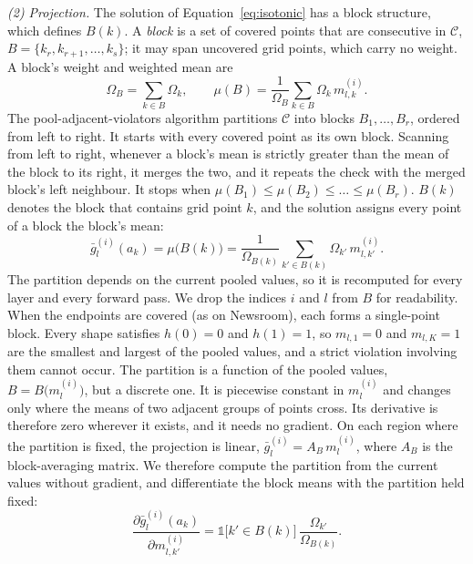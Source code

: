 \documentclass[11pt]{article}
\begin{document}
\emph{(2) Projection.}
The solution of Equation~\ref{eq:isotonic} has a block structure, which defines $B(k)$.
A \emph{block} is a set of covered points that are consecutive in $\mathcal{C}$, $B=\{k_r,k_{r+1},\dots,k_s\}$; it may span uncovered grid points, which carry no weight.
A block's weight and weighted mean are
\begin{equation}
  \Omega_B=\sum_{k\in B}\Omega_k,
  \qquad
  \mu(B)=\frac{1}{\Omega_B}\sum_{k\in B}\Omega_k\, m^{(i)}_{l,k} .
\end{equation}
The pool-adjacent-violators algorithm partitions $\mathcal{C}$ into blocks $B_1,\dots,B_r$, ordered from left to right.
It starts with every covered point as its own block.
Scanning from left to right, whenever a block's mean is strictly greater than the mean of the block to its right, it merges the two, and it repeats the check with the merged block's left neighbour.
It stops when $\mu(B_1)\le\mu(B_2)\le\dots\le\mu(B_r)$.
$B(k)$ denotes the block that contains grid point $k$, and the solution assigns every point of a block the block's mean:
\begin{equation}
  \bar g^{(i)}_l(a_k) = \mu\bigl(B(k)\bigr) = \frac{1}{\Omega_{B(k)}}\sum_{k'\in B(k)} \Omega_{k'}\, m^{(i)}_{l,k'} .
\end{equation}
The partition depends on the current pooled values, so it is recomputed for every layer and every forward pass.
We drop the indices $i$ and $l$ from $B$ for readability.
When the endpoints are covered (as on Newsroom), each forms a single-point block.
Every shape satisfies $h(0)=0$ and $h(1)=1$, so $m_{l,1}=0$ and $m_{l,K}=1$ are the smallest and largest of the pooled values, and a strict violation involving them cannot occur.
The partition is a function of the pooled values, $B=B\bigl(m^{(i)}_l\bigr)$, but a discrete one.
It is piecewise constant in $m^{(i)}_l$ and changes only where the means of two adjacent groups of points cross.
Its derivative is therefore zero wherever it exists, and it needs no gradient.
On each region where the partition is fixed, the projection is linear, $\bar g^{(i)}_l = A_{B}\, m^{(i)}_l$, where $A_B$ is the block-averaging matrix.
We therefore compute the partition from the current values without gradient, and differentiate the block means with the partition held fixed:
\begin{equation}
  \frac{\partial \bar g^{(i)}_l(a_k)}{\partial m^{(i)}_{l,k'}} = \mathbb{1}\bigl[k'\in B(k)\bigr]\,\frac{\Omega_{k'}}{\Omega_{B(k)}} .
  \label{eq:proj-jacobian}
\end{equation}
\end{document}
